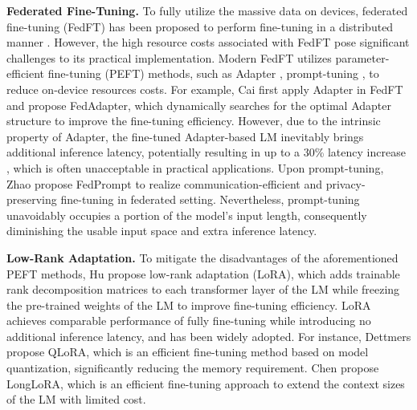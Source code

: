 \textbf{Federated Fine-Tuning.} 
To fully utilize the massive data on devices, federated fine-tuning (FedFT) has been proposed to perform fine-tuning in a distributed manner \cite{lin2021fednlp}.
However, the high resource costs associated with FedFT pose significant challenges to its practical implementation.
Modern FedFT utilizes parameter-efficient fine-tuning (PEFT) methods, such as Adapter \cite{houlsby2019parameter, cai2022fedadapter}, prompt-tuning \cite{lester2021power, zhao2023fedprompt}, to reduce on-device resources costs. 
For example, Cai \etal \cite{cai2022fedadapter} first apply Adapter in FedFT and propose FedAdapter, which dynamically searches for the optimal Adapter structure to improve the fine-tuning efficiency.
However, due to the intrinsic property of Adapter, the fine-tuned Adapter-based LM inevitably brings additional inference latency, potentially resulting in up to a 30\% latency increase \cite{hu2021lora, liao2023parameter, li2024caraserve}, which is often unacceptable in practical applications. 
Upon prompt-tuning, Zhao \etal \cite{zhao2023fedprompt} propose FedPrompt to realize communication-efficient and privacy-preserving fine-tuning in federated setting.
Nevertheless, prompt-tuning unavoidably occupies a portion of the model's input length, consequently diminishing the usable input space and extra inference latency.


\textbf{Low-Rank Adaptation.}
To mitigate the disadvantages of the aforementioned PEFT methods, Hu \etal \cite{hu2021lora} propose low-rank adaptation (LoRA), which adds trainable rank decomposition matrices to each transformer layer of the LM while freezing the pre-trained weights of the LM to improve fine-tuning efficiency. 
LoRA achieves comparable performance of fully fine-tuning while introducing no additional inference latency, and has been widely adopted.
For instance, Dettmers \etal \cite{dettmers2024qlora} propose QLoRA, which is an efficient fine-tuning method based on model quantization, significantly reducing the memory requirement.
Chen \etal \cite{chen2023longlora} propose LongLoRA, which is an efficient fine-tuning approach to extend the context sizes of the LM with limited cost.



